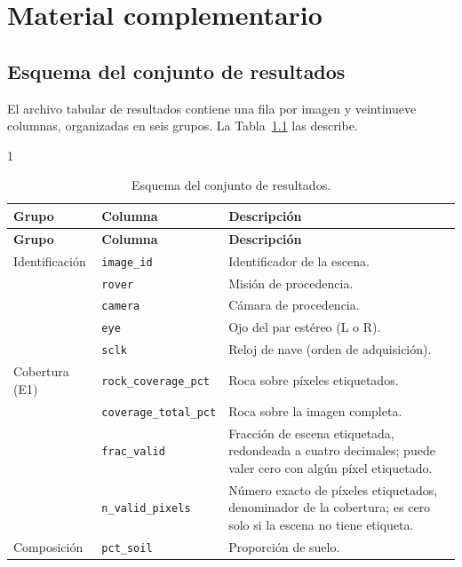 \chapter{Material complementario}
\label{app:material-complementario}

\section{Esquema del conjunto de resultados}

El archivo tabular de resultados contiene una fila por imagen y veintinueve columnas,
organizadas en seis grupos. La Tabla~\ref{tab:esquema} las describe.

\begin{spacing}{1}
\footnotesize
\begin{longtable}{llp{7.2cm}}
  \caption{Esquema del conjunto de resultados.}
  \label{tab:esquema}\\
    \toprule
    \textbf{Grupo} & \textbf{Columna} & \textbf{Descripción} \\
    \midrule
  \endfirsthead
    \toprule
    \textbf{Grupo} & \textbf{Columna} & \textbf{Descripción} \\
    \midrule
  \endhead
    Identificación & \texttt{image\_id}   & Identificador de la escena. \\
                   & \texttt{rover}       & Misión de procedencia. \\
                   & \texttt{camera}      & Cámara de procedencia. \\
                   & \texttt{eye}         & Ojo del par estéreo (L o R). \\
                   & \texttt{sclk}        & Reloj de nave (orden de adquisición). \\
    \midrule
    Cobertura (E1) & \texttt{rock\_coverage\_pct}  & Roca sobre píxeles etiquetados. \\
                   & \texttt{coverage\_total\_pct} & Roca sobre la imagen completa. \\
                   & \texttt{frac\_valid}          & Fracción de escena etiquetada, redondeada a cuatro
                     decimales; puede valer cero con algún píxel etiquetado. \\
                   & \texttt{n\_valid\_pixels}     & Número exacto de píxeles etiquetados, denominador de
                     la cobertura; es cero solo si la escena no tiene etiqueta. \\
    \midrule
    Composición    & \texttt{pct\_soil}       & Proporción de suelo. \\

\end{longtable}
\end{spacing}
